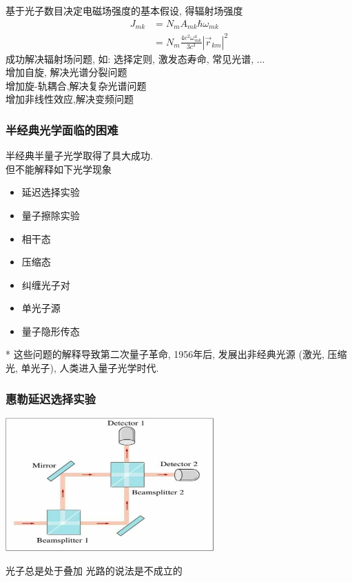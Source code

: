 \begin{frame}
      \frametitle{}
      基于光子数目决定电磁场强度的基本假设, 得辐射场强度
    \[\begin{aligned}
        J_{m k} &=N_{m} A_{m k} \hbar \omega_{m k} \\
        &=N_{m} \frac{4 e^{2} \omega_{m k}^{4}}{3 c^{3}}\left|\vec{r}_{k m}\right|^{2} 
        \end{aligned} \] {\vspace*{2.3em}}
    成功解决辐射场问题, 如: 选择定则, 激发态寿命, 常见光谱, ... \\ \vspace*{2.0em}
    增加自旋, 解决光谱分裂问题 \\
    增加旋-轨耦合,解决复杂光谱问题 \\ 
    增加非线性效应,解决变频问题 \\
\end{frame}

\begin{frame}
    \frametitle{半经典光学面临的困难}
    半经典半量子光学取得了具大成功. \\ 
    但不能解释如下光学现象
    \begin{itemize}
        \item 延迟选择实验
        \item 量子擦除实验
        \item 相干态
        \item 压缩态
        \item 纠缠光子对
        \item 单光子源
        \item 量子隐形传态
    \end{itemize}
    * 这些问题的解释导致第二次量子革命, 1956年后, 发展出非经典光源 (激光, 压缩光, 单光子), 人类进入量子光学时代.
\end{frame}

\begin{frame}
    \frametitle{惠勒延迟选择实验}
    \begin{center}
        \includegraphics[width=0.6\textwidth]{figs/choose.png} \\
    \end{center} 
    {\Bullet} 光子总是处于叠加
    {\Bullet} 光路的说法是不成立的
\end{frame}

